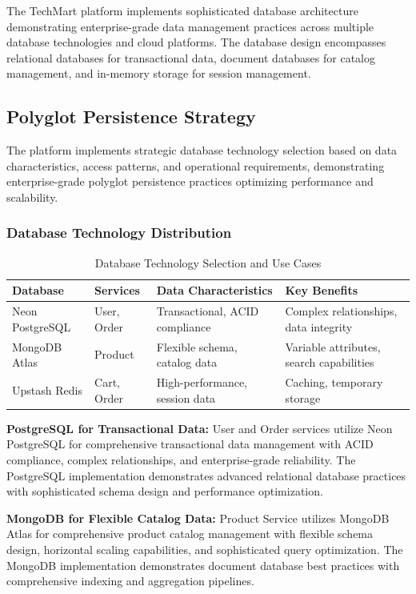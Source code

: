 The TechMart platform implements sophisticated database architecture demonstrating enterprise-grade data management practices across multiple database technologies and cloud platforms. The database design encompasses relational databases for transactional data, document databases for catalog management, and in-memory storage for session management.

\subsection{Polyglot Persistence Strategy}

The platform implements strategic database technology selection based on data characteristics, access patterns, and operational requirements, demonstrating enterprise-grade polyglot persistence practices optimizing performance and scalability.

\subsubsection{Database Technology Distribution}

\begin{table}[H]
\centering
\caption{Database Technology Selection and Use Cases}
\label{tab:database-technology-distribution}
\begin{tabular}{|p{3cm}|p{3cm}|p{4cm}|p{4cm}|}
\hline
\textbf{Database} & \textbf{Services} & \textbf{Data Characteristics} & \textbf{Key Benefits} \\
\hline
Neon PostgreSQL & User, Order & Transactional, ACID compliance & Complex relationships, data integrity \\
\hline
MongoDB Atlas & Product & Flexible schema, catalog data & Variable attributes, search capabilities \\
\hline
Upstash Redis & Cart, Order & High-performance, session data & Caching, temporary storage \\
\hline
\end{tabular}
\end{table}

\textbf{PostgreSQL for Transactional Data:}
User and Order services utilize Neon PostgreSQL for comprehensive transactional data management with ACID compliance, complex relationships, and enterprise-grade reliability. The PostgreSQL implementation demonstrates advanced relational database practices with sophisticated schema design and performance optimization.

\textbf{MongoDB for Flexible Catalog Data:}
Product Service utilizes MongoDB Atlas for comprehensive product catalog management with flexible schema design, horizontal scaling capabilities, and sophisticated query optimization. The MongoDB implementation demonstrates document database best practices with comprehensive indexing and aggregation pipelines.


